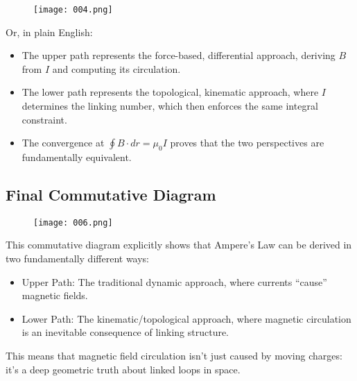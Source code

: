 \documentclass{article}
\begin{document}
\begin{figure}[h]
    \centering
    \texttt{[image: 004.png]} %
\end{figure}

Or, in plain English:

\begin{itemize}
    \item The upper path represents the force-based, differential approach, deriving \( B \) from \( I \) and computing its circulation.
    \item The lower path represents the topological, kinematic approach, where \( I \) determines the linking number, which then enforces the same integral constraint.
    \item The convergence at \( \oint B \cdot dr = \mu_0 I \) proves that the two perspectives are fundamentally equivalent.
\end{itemize}

\subsection{Final Commutative Diagram}

\begin{figure}[h]
    \centering
    \texttt{[image: 006.png]} %
\end{figure}


This commutative diagram explicitly shows that Ampere’s Law can be derived in two fundamentally different ways:

\begin{itemize}
    \item Upper Path: The traditional dynamic approach, where currents “cause” magnetic fields.
    \item Lower Path: The kinematic/topological approach, where magnetic circulation is an inevitable consequence of linking structure.
\end{itemize}

This means that magnetic field circulation isn’t just caused by moving charges: it’s a deep geometric truth about linked loops in space.
\end{document}
